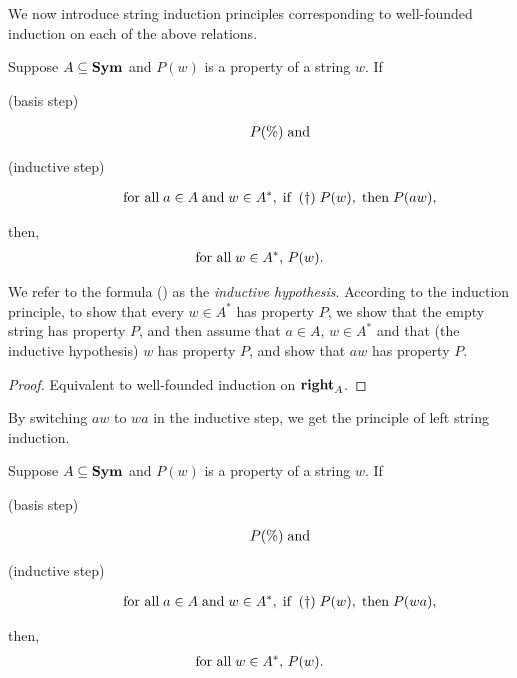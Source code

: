 We now introduce string induction principles corresponding to
well-founded induction on each of the above relations.

%
%
%
\begin{theorem}
Suppose $A\subseteq\mathbf{Sym}$ and $P(w)$ is a property of a string $w$.
If
\begin{description}
\item[\quad(basis step)]
\begin{gather*}
P(\%) \;\allowbreak\mbox{and}\allowbreak
\end{gather*}
\item[\quad(inductive step)]
\begin{gather*}
\allowbreak\mbox{for all}\allowbreak\;a\in A\;\allowbreak\mbox{and}\allowbreak\;w\in A^*,
\;\allowbreak\mbox{if}\allowbreak\;\;\allowbreak\mbox{\rm(\dag)}\allowbreak\; P(w),\;\allowbreak\mbox{then}\allowbreak\;P(aw),
\end{gather*}
\end{description}
then,
\begin{gather*}
\allowbreak\mbox{for all}\allowbreak\;w\in A^*,\,P(w) .
\end{gather*}
\end{theorem}

We refer to the formula (\dag) as the \emph{inductive hypothesis}.
According to the induction principle, to show that every $w\in A^*$
has property $P$, we show that the empty string has property $P$, and
then assume that $a\in A$, $w\in A^*$ and that (the inductive
hypothesis) $w$ has property $P$, and show that $aw$ has property
$P$.

\begin{proof}
Equivalent to well-founded induction on $\mathrel{\mathbf{right}}_A$.
\end{proof}

By switching $aw$ to $wa$ in the inductive step, we get the principle
of left string induction.

%
%
\begin{theorem}
Suppose $A\subseteq\mathbf{Sym}$ and $P(w)$ is a property of a string $w$.
If
\begin{description}
\item[\quad(basis step)]
\begin{gather*}
P(\%) \;\allowbreak\mbox{and}\allowbreak
\end{gather*}
\item[\quad(inductive step)]
\begin{gather*}
\allowbreak\mbox{for all}\allowbreak\;a\in A\;\allowbreak\mbox{and}\allowbreak\;w\in A^*,
\;\allowbreak\mbox{if}\allowbreak\; \;\allowbreak\mbox{\rm(\dag)}\allowbreak\; P(w),\;\allowbreak\mbox{then}\allowbreak\;P(wa),
\end{gather*}
\end{description}
then,
\begin{gather*}
\allowbreak\mbox{for all}\allowbreak\;w\in A^*,\,P(w) .
\end{gather*}
\end{theorem}


